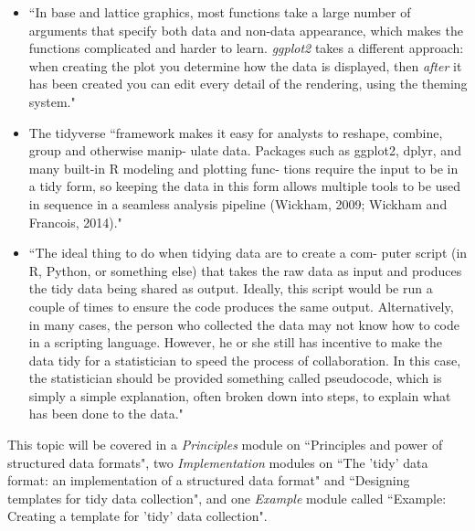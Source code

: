 \documentclass[pdftex,english,11pt,parskip=half]{scrartcl}
\begin{document}
\begin{itemize}
\item ``In base and lattice graphics, most functions take a large number of arguments that specify both data and non-data appearance, which makes the functions complicated and harder to learn. \textit{ggplot2} takes a different approach: when creating the plot you determine how the data is displayed, then \textit{after} it has been created you can edit every detail of the rendering, using the theming system." \cite{wickham2016ggplot2}
\item The tidyverse ``framework makes it easy for analysts to reshape, combine, group and otherwise manip- ulate data. Packages such as ggplot2, dplyr, and many built-in R modeling and plotting func- tions require the input to be in a tidy form, so keeping the data in this form allows multiple tools to be used in sequence in a seamless analysis pipeline (Wickham, 2009; Wickham and Francois, 2014)." \cite{robinson2014broom}
\item ``The ideal thing to do when tidying data are to create a com- puter script (in R, Python, or something else) that takes the raw data as input and produces the tidy data being shared as output. Ideally, this script would be run a couple of times to ensure the code produces the same output. Alternatively, in many cases, the person who collected the data may not know how to code in a scripting language. However, he or she still has incentive to make the data tidy for a statistician to speed the process of collaboration. In this case, the statistician should be provided something called pseudocode, which is simply a simple explanation, often broken down into steps, to explain what has been done to the data." \cite{ellis2018share}
\end{itemize}

This topic will
be covered in a \textit{Principles} module on ``Principles and power of
structured data formats", two \textit{Implementation} modules on ``The 'tidy'
data format: an implementation of a structured data format" and ``Designing
templates for tidy data collection", and one \textit{Example} module called
``Example: Creating a template for 'tidy' data collection".
\end{document}
